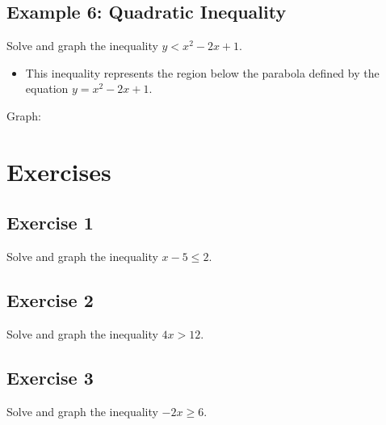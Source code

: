 \documentclass[12pt]{article}
\begin{document}
\subsection*{Example 6: Quadratic Inequality}

Solve and graph the inequality \( y < x^2 - 2x + 1 \).

\begin{itemize}
    \item This inequality represents the region below the parabola defined by the equation \( y = x^2 - 2x + 1 \).
\end{itemize}

Graph:

\begin{center}
\end{center}

\section*{Exercises}

\subsection*{Exercise 1}

Solve and graph the inequality \( x - 5 \leq 2 \).

\subsection*{Exercise 2}

Solve and graph the inequality \( 4x > 12 \).

\subsection*{Exercise 3}

Solve and graph the inequality \( -2x \geq 6 \).
\end{document}
